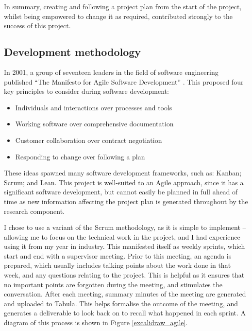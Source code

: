 
In summary, creating and following a project plan from the start of the project, whilst being empowered to change it as required, contributed strongly to the success of this project.

\subsection{Development methodology}
\label{ssec:organisation-methodology}

In 2001, a group of seventeen leaders in the field of software engineering published ``The Manifesto for Agile Software Development'' \cite{beckManifestoAgileSoftware2001}. This proposed four key principles to consider during software development:

\begin{itemize}
    \item Individuals and interactions over processes and tools
    \item Working software over comprehensive documentation
    \item Customer collaboration over contract negotiation
    \item Responding to change over following a plan
\end{itemize}

These ideas spawned many software development frameworks, such as: Kanban; Scrum; and Lean. This project is well-suited to an Agile approach, since it has a significant software development, but cannot easily be planned in full ahead of time as new information affecting the project plan is generated throughout by the research component.

I chose to use a variant of the Scrum methodology, as it is simple to implement -- allowing me to focus on the technical work in the project, and I had experience using it from my year in industry. This manifested itself as weekly sprints, which start and end with a supervisor meeting. Prior to this meeting, an agenda is prepared, which usually includes talking points about the work done in that week, and any questions relating to the project. This is helpful as it ensures that no important points are forgotten during the meeting, and stimulates the conversation. After each meeting, summary minutes of the meeting are generated and uploaded to Tabula. This helps formalise the outcome of the meeting, and generates a deliverable to look back on to recall what happened in each sprint. A diagram of this process is shown in Figure \ref{excalidraw_agile}.

